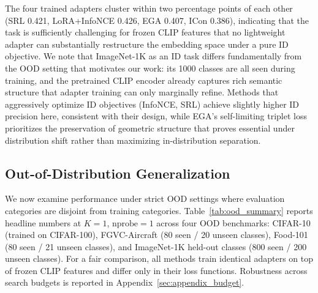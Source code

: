 \documentclass{article}
\begin{document}
The four trained adapters cluster within two percentage points of each other (SRL 0.421, LoRA+InfoNCE 0.426, EGA 0.407, ICon 0.386), indicating that the task is sufficiently challenging for frozen CLIP features that no lightweight adapter can substantially restructure the embedding space under a pure ID objective.
We note that ImageNet-1K as an ID task differs fundamentally from the OOD setting that motivates our work: its 1000 classes are all seen during training, and the pretrained CLIP encoder already captures rich semantic structure that adapter training can only marginally refine.
Methods that aggressively optimize ID objectives (InfoNCE, SRL) achieve slightly higher ID precision here, consistent with their design, while EGA's self-limiting triplet loss prioritizes the preservation of geometric structure that proves essential under distribution shift rather than maximizing in-distribution separation.

\subsection{Out-of-Distribution Generalization}
\label{sec:ood}

We now examine performance under strict OOD settings where evaluation categories are disjoint from training categories.
Table~\ref{tab:ood_summary} reports headline numbers at $K=1$, $\text{nprobe}=1$ across four OOD benchmarks: CIFAR-10 (trained on CIFAR-100), FGVC-Aircraft (80 seen / 20 unseen classes), Food-101 (80 seen / 21 unseen classes), and ImageNet-1K held-out classes (800 seen / 200 unseen classes).
For a fair comparison, all methods train identical adapters on top of frozen CLIP features and differ only in their loss functions.
Robustness across search budgets is reported in Appendix~\ref{sec:appendix_budget}.
\end{document}
